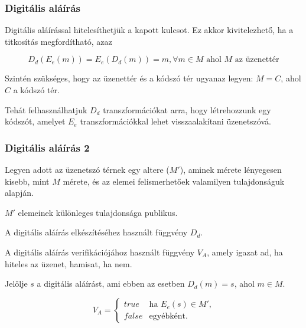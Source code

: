\documentclass{beamer}
\begin{document}
\begin{frame}
    \frametitle{Digitális aláírás}

    Digitális aláírással hitelesíthetjük a kapott kulcsot. Ez akkor kivitelezhető, ha a titkosítás megfordítható, azaz

    \[D_d(E_e(m)) = E_e(D_d(m)) = m, \forall m \in M \text{ ahol $M$ az üzenettér}\]

    Szintén szükséges, hogy az üzenettér és a kódszó tér ugyanaz legyen: $M = C$, ahol $C$ a kódszó tér.

    Tehát felhasználhatjuk $D_d$ transzformációkat arra, hogy létrehozzunk egy kódszót, amelyet $E_e$ transzformációkkal
    lehet visszaalakítani üzenetszóvá.
\end{frame}

\begin{frame}
    \frametitle{Digitális aláírás 2}

    Legyen adott az üzenetszó térnek egy altere ($M'$), aminek mérete lényegesen kisebb, mint $M$ mérete, és az elemei
    felismerhetőek valamilyen tulajdonságuk alapján.

    $M'$ elemeinek különleges tulajdonsága publikus.

    A digitális aláírás elkészítéséhez használt függvény $D_d$.

    A digitális aláírás verifikációjához használt függvény $V_A$, amely igazat ad, ha hiteles az üzenet, hamisat, ha
    nem.

    Jelölje $s$ a digitális aláírást, ami ebben az esetben $D_d(m) = s$, ahol $m \in M$.

    \begin{equation}
        V_A =
        \begin{cases}
            true  & \text{ha $E_e(s) \in M'$,} \\
            false & \text{egyébként.}
        \end{cases}
    \end{equation}

\end{frame}
\end{document}
